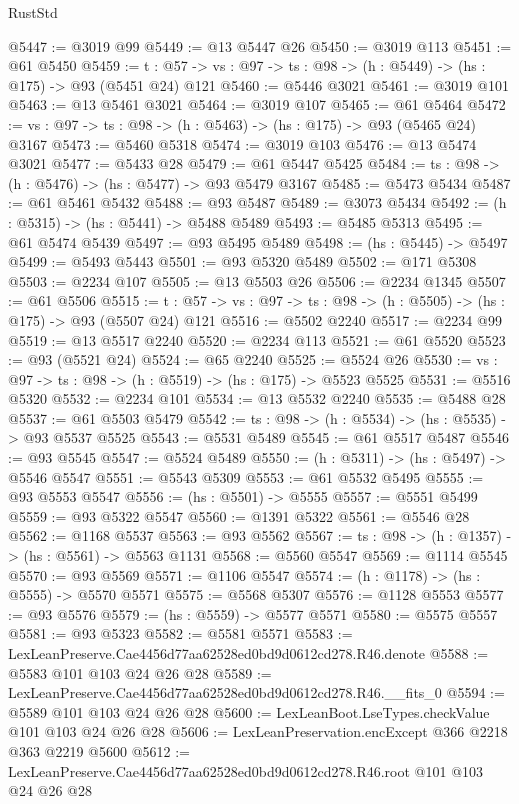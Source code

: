 \begin{lexlean}{RustStd}
\begin{coremodule}
@5447 := @3019 @99
@5449 := @13 @5447 @26
@5450 := @3019 @113
@5451 := @61 @5450
@5459 := {t : @57} -> {vs : @97} -> {ts : @98} -> (h : @5449) -> (hs : @175) -> @93 (@5451 @24) @121
@5460 := @5446 @3021
@5461 := @3019 @101
@5463 := @13 @5461 @3021
@5464 := @3019 @107
@5465 := @61 @5464
@5472 := {vs : @97} -> {ts : @98} -> (h : @5463) -> (hs : @175) -> @93 (@5465 @24) @3167
@5473 := @5460 @5318
@5474 := @3019 @103
@5476 := @13 @5474 @3021
@5477 := @5433 @28
@5479 := @61 @5447 @5425
@5484 := {ts : @98} -> (h : @5476) -> (hs : @5477) -> @93 @5479 @3167
@5485 := @5473 @5434
@5487 := @61 @5461 @5432
@5488 := @93 @5487
@5489 := @3073 @5434
@5492 := (h : @5315) -> (hs : @5441) -> @5488 @5489
@5493 := @5485 @5313
@5495 := @61 @5474 @5439
@5497 := @93 @5495 @5489
@5498 := (hs : @5445) -> @5497
@5499 := @5493 @5443
@5501 := @93 @5320 @5489
@5502 := @171 @5308
@5503 := @2234 @107
@5505 := @13 @5503 @26
@5506 := @2234 @1345
@5507 := @61 @5506
@5515 := {t : @57} -> {vs : @97} -> {ts : @98} -> (h : @5505) -> (hs : @175) -> @93 (@5507 @24) @121
@5516 := @5502 @2240
@5517 := @2234 @99
@5519 := @13 @5517 @2240
@5520 := @2234 @113
@5521 := @61 @5520
@5523 := @93 (@5521 @24)
@5524 := @65 @2240
@5525 := @5524 @26
@5530 := {vs : @97} -> {ts : @98} -> (h : @5519) -> (hs : @175) -> @5523 @5525
@5531 := @5516 @5320
@5532 := @2234 @101
@5534 := @13 @5532 @2240
@5535 := @5488 @28
@5537 := @61 @5503 @5479
@5542 := {ts : @98} -> (h : @5534) -> (hs : @5535) -> @93 @5537 @5525
@5543 := @5531 @5489
@5545 := @61 @5517 @5487
@5546 := @93 @5545
@5547 := @5524 @5489
@5550 := (h : @5311) -> (hs : @5497) -> @5546 @5547
@5551 := @5543 @5309
@5553 := @61 @5532 @5495
@5555 := @93 @5553 @5547
@5556 := (hs : @5501) -> @5555
@5557 := @5551 @5499
@5559 := @93 @5322 @5547
@5560 := @1391 @5322
@5561 := @5546 @28
@5562 := @1168 @5537
@5563 := @93 @5562
@5567 := {ts : @98} -> (h : @1357) -> (hs : @5561) -> @5563 @1131
@5568 := @5560 @5547
@5569 := @1114 @5545
@5570 := @93 @5569
@5571 := @1106 @5547
@5574 := (h : @1178) -> (hs : @5555) -> @5570 @5571
@5575 := @5568 @5307
@5576 := @1128 @5553
@5577 := @93 @5576
@5579 := (hs : @5559) -> @5577 @5571
@5580 := @5575 @5557
@5581 := @93 @5323
@5582 := @5581 @5571
@5583 := LexLeanPreserve.Cae4456d77aa62528ed0bd9d0612cd278.R46.denote
@5588 := @5583 @101 @103 @24 @26 @28
@5589 := LexLeanPreserve.Cae4456d77aa62528ed0bd9d0612cd278.R46.__fits_0
@5594 := @5589 @101 @103 @24 @26 @28
@5600 := LexLeanBoot.LseTypes.checkValue @101 @103 @24 @26 @28
@5606 := LexLeanPreservation.encExcept @366 @2218 @363 @2219 @5600
@5612 := LexLeanPreserve.Cae4456d77aa62528ed0bd9d0612cd278.R46.root @101 @103 @24 @26 @28

\end{coremodule}
\end{lexlean}
